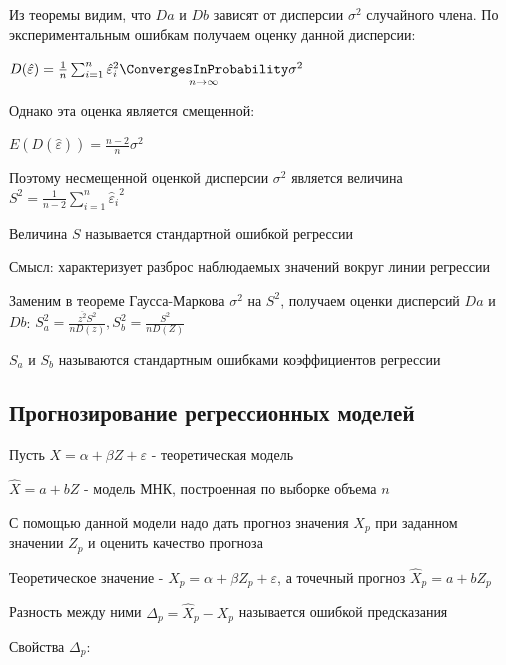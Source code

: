 \documentclass[12pt]{article}
\begin{document}
Из теоремы видим, что $Da$ и $Db$ зависят от дисперсии $\sigma^2$ случайного члена. 
По экспериментальным ошибкам получаем оценку данной дисперсии:

$D(\hat \varepsilon) = \frac{1}{n} \sum_{i = 1}^n {\hat \varepsilon_i}^2 \underset{n \to \infty}{\ConvergesInProbability} \sigma^2$

Однако эта оценка является смещенной:

$E(D(\hat \varepsilon)) = \frac{n - 2}{n} \sigma^2$

Поэтому несмещенной оценкой дисперсии $\sigma^2$ является величина $S^2 = \frac{1}{n - 2} \sum_{i = 1}^n {\hat \varepsilon_i}^2$

\Def Величина $S$ называется стандартной ошибкой регрессии

Смысл: характеризует разброс наблюдаемых значений вокруг линии регрессии

\Nota Заменим в теореме Гаусса-Маркова $\sigma^2$ на $S^2$, получаем оценки дисперсий $Da$ и $Db$: $S_a^2 = \frac{\overline{z^2} S^2}{n D(z)}, S^2_b = \frac{S^2}{n D(Z)}$

\Def $S_a$ и $S_b$ называются стандартным ошибками коэффициентов регрессии

\subsection{Прогнозирование регрессионных моделей}

Пусть $X = \alpha + \beta Z + \varepsilon$ - теоретическая модель

$\hat X = a + b Z$ - модель МНК, построенная по выборке объема $n$

С помощью данной модели надо дать прогноз значения $X_p$ при заданном значении $Z_p$ и оценить качество прогноза 

Теоретическое значение - $X_p = \alpha + \beta Z_p + \varepsilon$, а точечный прогноз $\hat X_p = a + b Z_p$

Разность между ними $\Delta_p = \hat X_p - X_p$ называется ошибкой предсказания

Свойства $\Delta_p$:
\end{document}
